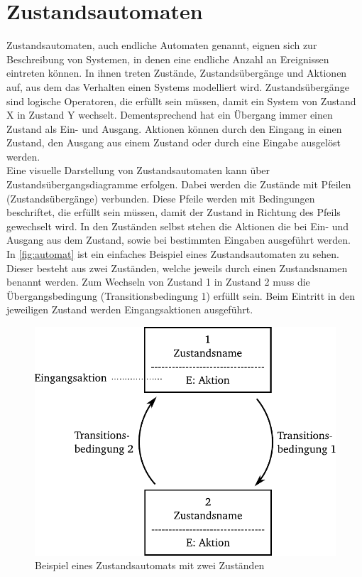 \section{Zustandsautomaten}
Zustandsautomaten, auch endliche Automaten genannt, eignen sich zur Beschreibung von Systemen, in denen eine endliche Anzahl an Ereignissen eintreten können. In ihnen treten Zustände, Zustandsübergänge und Aktionen auf, aus dem das Verhalten einen Systems modelliert wird. Zustandsübergänge sind logische Operatoren, die erfüllt sein müssen, damit ein System von Zustand X in Zustand Y wechselt. Dementsprechend hat ein Übergang immer einen Zustand als Ein- und Ausgang. Aktionen können durch den Eingang in einen Zustand, den Ausgang aus einem Zustand oder durch eine Eingabe ausgelöst werden. \\
Eine visuelle Darstellung von Zustandsautomaten kann über Zustandsübergangsdiagramme erfolgen. Dabei werden die Zustände mit Pfeilen (Zustandsübergänge) verbunden. Diese Pfeile werden mit Bedingungen beschriftet, die erfüllt sein müssen, damit der Zustand in Richtung des Pfeils gewechselt wird. In den Zuständen selbst stehen die Aktionen die bei Ein- und Ausgang aus dem Zustand, sowie bei bestimmten Eingaben ausgeführt werden.\\
In \autoref{fig:automat} ist ein einfaches Beispiel eines Zustandsautomaten zu sehen. Dieser besteht aus zwei Zuständen, welche jeweils durch einen Zustandsnamen benannt werden. Zum Wechseln von Zustand 1 in Zustand 2 muss die Übergangsbedingung (Transitionsbedingung 1) erfüllt sein. Beim Eintritt in den jeweiligen Zustand werden Eingangsaktionen ausgeführt.
\begin{figure}[H]
	\centering
		\includegraphics[width=0.6\columnwidth]{Bilder/automat.pdf}
	\caption{Beispiel eines Zustandsautomats mit zwei Zuständen}
	\label{fig:automat}
\end{figure} \noindent

